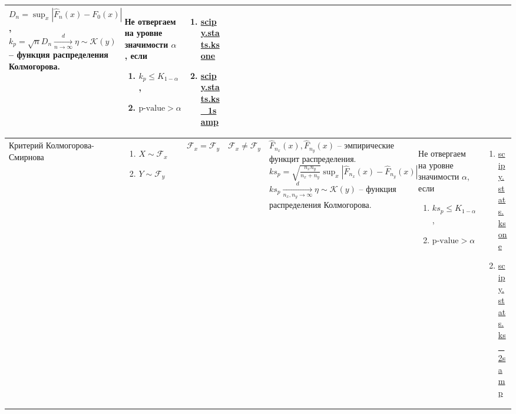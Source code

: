 \documentclass[14pt, a1paper, fleqn]{extarticle}
\begin{document}
\begin{center}
\begin{tabular}{|p{6cm}|p{8cm}|p{3cm}|p{3cm}|p{9cm}|p{10cm}|p{14cm}|}
            \( D_n = \sup_x \left| \widehat{F}_n (x) - F_0 (x) \right| \),
            \newline
            \( k_p = \sqrt{n} D_n \xrightarrow[n \to \infty]{d} \eta \sim \mathcal{K}(y) \) -- функция распределения Колмогорова.
            & Не отвергаем на уровне значимости \( \alpha \), если 
            \begin{enumerate}
                \item \( k_p \leq K_{1-\alpha} \),
                \item \( \text{p-value} > \alpha \)
            \end{enumerate} 
            & \begin{enumerate}
                \item \href{https://docs.scipy.org/doc/scipy/reference/generated/scipy.stats.ksone.html}{scipy.stats.ksone}
                \item \href{https://docs.scipy.org/doc/scipy/reference/generated/scipy.stats.ks_1samp.html}{scipy.stats.ks\_1samp}
            \end{enumerate} \\
            \hline
            Критерий Колмогорова-Смирнова
            & \begin{enumerate}
             \item \( X \sim \mathcal{F}_x \)
             \item \( Y \sim \mathcal{F}_y \)
            \end{enumerate} 
            & \( \mathcal{F}_x = \mathcal{F}_y \) 
            & \( \mathcal{F}_x \neq \mathcal{F}_y \) 
            & \( \widehat{F}_{n_x} (x), \widehat{F}_{n_y} (x) \) -- эмпирические функцит распределения.
            \newline
            \( ks_p = \sqrt{\frac{n_x n_y}{n_x + n_y}} \sup_x \left| \widehat{F}_{n_x} (x) - \widehat{F}_{n_y} (x) \right|\) 
            \( ks_p \xrightarrow[n_x, n_y \to \infty]{d} \eta \sim \mathcal{K}(y) \) -- функция распределения Колмогорова.
            & Не отвергаем на уровне значимости \( \alpha \), если 
            \begin{enumerate}
                \item \( ks_p \leq K_{1-\alpha} \),
                \item \( \text{p-value} > \alpha \)
            \end{enumerate} 
            & \begin{enumerate}
                \item \href{https://docs.scipy.org/doc/scipy/reference/generated/scipy.stats.ksone.html}{scipy.stats.ksone}
                \item \href{https://docs.scipy.org/doc/scipy/reference/generated/scipy.stats.ks_2samp.html}{scipy.stats.ks\_2samp}
            \end{enumerate} \\
            \hline
        \end{tabular}
    \end{center}
\end{document}
